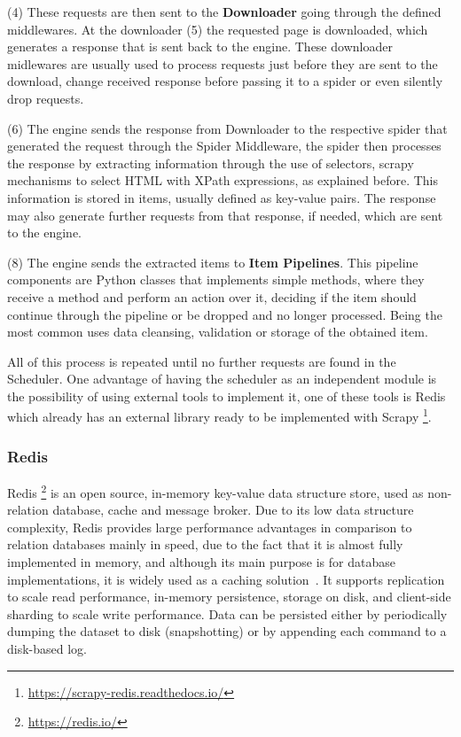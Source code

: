 (4) These requests are then sent to the \textbf{Downloader} going through the defined middlewares. At the downloader (5) the requested page is downloaded, which generates a response that is sent back to the engine. These downloader midlewares are usually used to process requests just before they are sent to the download, change received response before passing it to a spider or even silently drop requests.

(6) The engine sends the response from Downloader to the respective spider that generated the request through the Spider Middleware, the spider then processes the response by extracting information through the use of selectors, scrapy mechanisms to select HTML with XPath expressions, as explained before. This information is stored in items, usually defined as key-value pairs. The response may also generate further requests from that response, if needed, which are sent to the engine.

(8) The engine sends the extracted items to \textbf{Item Pipelines}. This pipeline components are Python classes that implements simple methods, where they receive a method and perform an action over it, deciding if the item should continue through the pipeline or be dropped and no longer processed. Being the most common uses data cleansing, validation or storage of the obtained item.

All of this process is repeated until no further requests are found in the Scheduler. One advantage of having the scheduler as an independent module is the possibility of using external tools to implement it, one of these tools is Redis which already has an external library ready to be implemented with Scrapy \footnote{\url{https://scrapy-redis.readthedocs.io/}}.

\subsubsection{Redis}
\label{sss:redis}


Redis \footnote{\url{https://redis.io/}} is an open source, in-memory key-value data structure store, used as non-relation database, cache and message broker. Due to its low data structure complexity, Redis provides large performance advantages in comparison to relation databases mainly in speed, due to the fact that it is almost fully implemented in memory, and although its main purpose is for database implementations, it is widely used as a caching solution~\cite{9047417}. It supports replication to scale read performance, in-memory persistence, storage on disk, and client-side sharding to scale write performance. Data can be persisted either by periodically dumping the dataset to disk (snapshotting) or by appending each command to a disk-based log.

